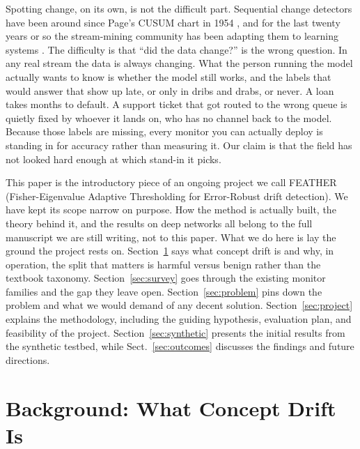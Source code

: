 \documentclass[graybox]{SNmult}
\begin{document}
Spotting change, on its own, is not the difficult part. Sequential
change detectors have been around since Page's CUSUM chart in 1954
\cite{page1954cusum}, and for the last twenty years or so the
stream-mining community has been adapting them to learning systems
\cite{gama2004learning, baena2006eddm, bifet2007adwin, raab2020kswin}.
The difficulty is that ``did the data change?'' is the wrong question.
In any real stream the data is always changing. What the person running
the model actually wants to know is whether the model still works, and
the labels that would answer that show up late, or only in dribs and
drabs, or never. A loan takes months to default. A support ticket that
got routed to the wrong queue is quietly fixed by whoever it lands on,
who has no channel back to the model. Because those labels are missing,
every monitor you can actually deploy is standing in for accuracy rather
than measuring it. Our claim is that the field has not looked hard
enough at which stand-in it picks.

This paper is the introductory piece of an ongoing project we call
FEATHER (Fisher-Eigenvalue Adaptive Thresholding for Error-Robust drift
detection). We have kept its scope narrow on purpose. How the method is
actually built, the theory behind it, and the results on deep networks
all belong to the full manuscript we are still writing, not to this
paper. What we do here is lay the ground the project rests on.
Section~\ref{sec:background} says what concept drift is and why, in
operation, the split that matters is harmful versus benign rather than
the textbook taxonomy. Section~\ref{sec:survey} goes through the
existing monitor families and the gap they leave open.
Section~\ref{sec:problem} pins down the problem and what we would demand
of any decent solution. Section~\ref{sec:project} explains the methodology, including the guiding hypothesis, evaluation plan, and feasibility of the project.
Section~\ref{sec:synthetic} presents the initial results from the synthetic testbed, while Sect.~\ref{sec:outcomes} discusses the findings and future directions.


\section{Background: What Concept Drift Is}
\label{sec:background}
\end{document}
